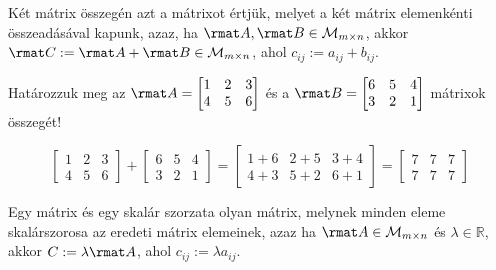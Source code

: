 
\begin{definition}
  Két mátrix összegén azt a mátrixot értjük, melyet a két mátrix elemenkénti
  összeadásával kapunk, azaz, ha $\rmat A, \rmat B \in \mathcal M_{m \times n}$,
  akkor $\rmat C := \rmat A + \rmat B \in \mathcal M_{m \times n}$, ahol
  $c_{ij} := a_{ij} + b_{ij}$.
\end{definition}

\begin{example}
  Határozzuk meg az $\rmat A = \begin{bmatrix}
      1 & 2 & 3 \\
      4 & 5 & 6
    \end{bmatrix}$ és a $\rmat B = \begin{bmatrix}
      6 & 5 & 4 \\
      3 & 2 & 1
    \end{bmatrix}$ mátrixok összegét!

  \hdashrule[.8ex][x]{\dimexpr\textwidth}{1pt}{2mm 3pt}
  $$
    \begin{bmatrix}
      1 & 2 & 3 \\
      4 & 5 & 6
    \end{bmatrix}
    +
    \begin{bmatrix}
      6 & 5 & 4 \\
      3 & 2 & 1
    \end{bmatrix}
    =
    \begin{bmatrix}
      1 + 6 & 2 + 5 & 3 + 4 \\
      4 + 3 & 5 + 2 & 6 + 1
    \end{bmatrix}
    =
    \begin{bmatrix}
      7 & 7 & 7 \\
      7 & 7 & 7
    \end{bmatrix}
  $$
\end{example}

\begin{definition}
  Egy mátrix és egy skalár szorzata olyan mátrix, melynek minden eleme
  skalárszorosa az eredeti mátrix elemeinek, azaz ha
  $\rmat A \in \mathcal M_{m \times n}$ és $\lambda \in \mathbb R$, akkor
  $C := \lambda \rmat A$, ahol $c_{ij} := \lambda a_{ij}$.
\end{definition}

